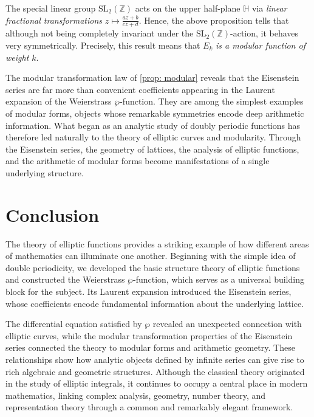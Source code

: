 \documentclass[12pt,reqno]{amsart}
\theoremstyle{plain}
\numberwithin{equation}{section}
\begin{document}
The special linear group $\mathrm{SL}_2(\mathbb Z)$ acts on the upper half-plane $\mathbb H$ via \textit{linear fractional transformations} $z\mapsto \frac{az+ b}{cz+d}$. Hence, the above proposition tells that although not being completely invariant under the $\mathrm{SL}_2(\mathbb Z)$-action, it behaves very symmetrically. Precisely, this result means that $E_k$ \textit{is a modular function of weight $k$}. 

The modular transformation law of \cref{prop: modular} reveals that the Eisenstein series are far more than convenient coefficients appearing in the Laurent expansion of the Weierstrass $\wp$-function. They are among the simplest examples of modular forms, objects whose remarkable symmetries encode deep arithmetic information. What began as an analytic study of doubly periodic functions has therefore led naturally to the theory of elliptic curves and modularity. Through the Eisenstein series, the geometry of lattices, the analysis of elliptic functions, and the arithmetic of modular forms become manifestations of a single underlying structure.

\section*{Conclusion}

The theory of elliptic functions provides a striking example of how different areas of mathematics can illuminate one another. Beginning with the simple idea of double periodicity, we developed the basic structure theory of elliptic functions and constructed the Weierstrass $\wp$-function, which serves as a universal building block for the subject. Its Laurent expansion introduced the Eisenstein series, whose coefficients encode fundamental information about the underlying lattice.

The differential equation satisfied by $\wp$ revealed an unexpected connection with elliptic curves, while the modular transformation properties of the Eisenstein series connected the theory to modular forms and arithmetic geometry. These relationships show how analytic objects defined by infinite series can give rise to rich algebraic and geometric structures. Although the classical theory originated in the study of elliptic integrals, it continues to occupy a central place in modern mathematics, linking complex analysis, geometry, number theory, and representation theory through a common and remarkably elegant framework.
\end{document}
